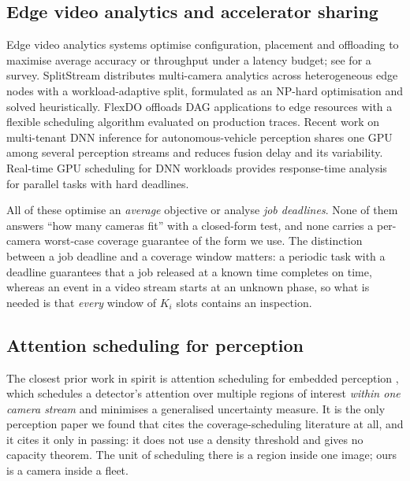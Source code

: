 \documentclass[preprint,review,12pt]{elsarticle}
\theoremstyle{definition}
\newcommand{\Ki}{K_i}
\begin{document}
\subsection{Edge video analytics and accelerator sharing}
Edge video analytics systems optimise configuration, placement and offloading to maximise average
accuracy or throughput under a latency budget; see \cite{zhou2023comst} for a survey. SplitStream
\cite{liang2024splitstream} distributes multi-camera analytics across heterogeneous edge nodes with
a workload-adaptive split, formulated as an NP-hard optimisation and solved heuristically. FlexDO
\cite{queiroz2024flexdo} offloads DAG applications to edge resources with a flexible scheduling
algorithm evaluated on production traces. Recent work on multi-tenant DNN inference for
autonomous-vehicle perception \cite{liu2026multitenant} shares one GPU among several perception
streams and reduces fusion delay and its variability. Real-time GPU scheduling for DNN workloads
\cite{zou2023rtgpu} provides response-time analysis for parallel tasks with hard deadlines.

All of these optimise an \emph{average} objective or analyse \emph{job deadlines}. None of them
answers ``how many cameras fit'' with a closed-form test, and none carries a per-camera
worst-case coverage guarantee of the form we use. The distinction between a job deadline and a
coverage window matters: a periodic task with a deadline guarantees that a job released at a known
time completes on time, whereas an event in a video stream starts at an unknown phase, so what is
needed is that \emph{every} window of $\Ki$ slots contains an inspection.

\subsection{Attention scheduling for perception}
The closest prior work in spirit is attention scheduling for embedded perception
\cite{liu2023attention}, which schedules a detector's attention over multiple regions of interest
\emph{within one camera stream} and minimises a generalised uncertainty measure. It is the only
perception paper we found that cites the coverage-scheduling literature at all, and it cites it
only in passing: it does not use a density threshold and gives no capacity theorem. The unit of
scheduling there is a region inside one image; ours is a camera inside a fleet.
\end{document}
